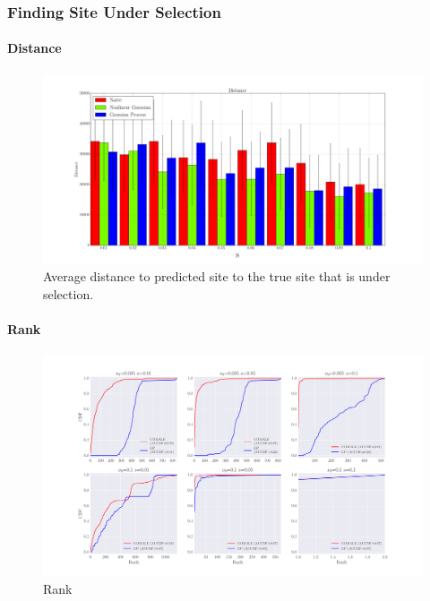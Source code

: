 \subsubsection{Finding Site Under Selection}
\paragraph{Distance}
\begin{figure}[H]
  \centering
    \includegraphics[width=\textwidth]{dist}
  \caption{Average distance to predicted site to the true site that is under selection.}
  \label{fig:Fig1}
\end{figure}

\paragraph{Rank}
\begin{figure}[H]
  \centering
    \includegraphics[width=\textwidth]{rank}
  \caption{Rank}
  \label{fig:Fig3}
\end{figure}

